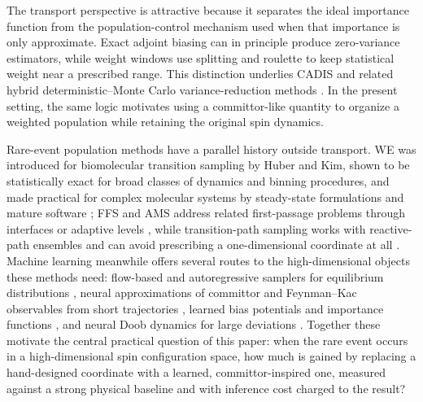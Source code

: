 \documentclass[a4paper,fleqn]{cas-sc}
\begin{document}
The transport perspective is attractive because it separates the ideal importance function
from the population-control mechanism used when that importance is only approximate. Exact
adjoint biasing can in principle produce zero-variance estimators, while weight windows use
splitting and roulette to keep statistical weight near a prescribed range. This distinction
underlies CADIS and related hybrid deterministic--Monte Carlo variance-reduction methods
\citep{wagner1998,haghighat2003,wagnerfw2014}. In the present setting, the same logic
motivates using a committor-like quantity to organize a weighted population while retaining
the original spin dynamics.

Rare-event population methods have a parallel history outside transport. WE was introduced
for biomolecular transition sampling by Huber and Kim, shown to be statistically exact for
broad classes of dynamics and binning procedures, and made practical for complex molecular
systems by steady-state formulations and mature software
\citep{huber1996,zhang2010,bhatt2010,russo2022}; FFS and AMS address related first-passage
problems through interfaces or adaptive levels \citep{allen2009,valeriani2007,cerou2007},
while transition-path sampling works with reactive-path ensembles and can avoid prescribing a
one-dimensional coordinate at all \citep{dellago1998,bolhuis2002}. Machine learning
meanwhile offers several routes to the high-dimensional objects these methods need: flow-based
and autoregressive samplers for equilibrium distributions
\citep{wu2019,noe2019,nicoli2020,gabrie2022}, neural approximations of committor and
Feynman--Kac observables from short trajectories \citep{khoo2019,strahan2023}, learned bias
potentials and importance functions \citep{hua2024,kimcai2026}, and neural Doob dynamics for
large deviations \citep{zhao2025}. Together these motivate the central practical question of
this paper: when the rare event occurs in a high-dimensional spin configuration space, how
much is gained by replacing a hand-designed coordinate with a learned, committor-inspired one,
measured against a strong physical baseline and with inference cost charged to the result?
\end{document}
